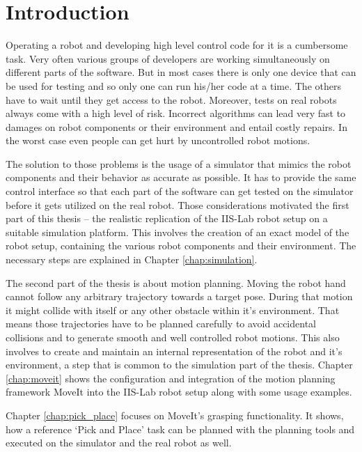 
\chapter{Introduction}

Operating a robot and developing high level control code for it is a cumbersome task. Very often various groups of developers are working simultaneously on different parts of the software. But in most cases there is only one device that can be used for testing and so only one can run his/her code at a time. The others have to wait until they get access to the robot. Moreover, tests on real robots always come with a high level of risk. Incorrect algorithms can lead very fast to damages on robot components or their environment and entail costly repairs. In the worst case even people can get hurt by uncontrolled robot motions.

The solution to those problems is the usage of a simulator that mimics the robot components and their behavior as accurate as possible. It has to provide the same control interface so that each part of the software can get tested on the simulator before it gets utilized on the real robot. Those considerations motivated the first part of this thesis -- the realistic replication of the IIS-Lab robot setup on a suitable simulation platform. This involves the creation of an exact model of the robot setup, containing the various robot components and their environment. The necessary steps are explained in Chapter \ref{chap:simulation}.

The second part of the thesis is about motion planning. Moving the robot hand cannot follow any arbitrary trajectory towards a target pose. During that motion it might collide with itself or any other obstacle within it's environment. That means those trajectories have to be planned carefully to avoid accidental collisions and to generate smooth and well controlled robot motions. This also involves to create and maintain an internal representation of the robot and it's environment, a step that is common to the simulation part of the thesis. Chapter \ref{chap:moveit} shows the configuration and integration of the motion planning framework MoveIt into the IIS-Lab robot setup along with some usage examples.

Chapter \ref{chap:pick_place} focuses on MoveIt's grasping functionality. It shows, how a reference `Pick and Place' task can be planned with the planning tools  and executed on the simulator and the real robot as well.

